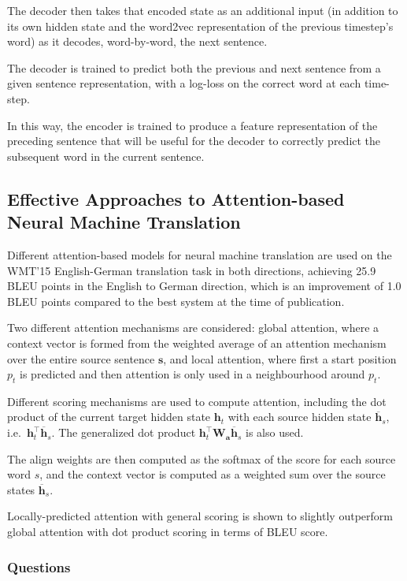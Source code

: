 \documentclass[a4paper, 12pt]{article}
\begin{document}
The decoder then takes that encoded state as an additional input (in addition
to its own hidden state and the word2vec representation of the previous
timestep's word) as it decodes, word-by-word, the next sentence.

The decoder is trained to predict both the previous and next sentence from a
given sentence representation, with a log-loss on the correct word at each
time-step.

In this way, the encoder is trained to produce a feature representation of the
preceding sentence that will be useful for the decoder to correctly predict the
subsequent word in the current sentence.


\subsection{Effective Approaches to Attention-based Neural Machine
            Translation~\citet{DBLP:journals/corr/LuongPM15}}

Different attention-based models for neural machine translation are used on the
WMT'15 English-German translation task in both directions, achieving 25.9 BLEU
points in the English to German direction, which is an improvement of 1.0 BLEU
points compared to the best system at the time of publication.

Two different attention mechanisms are considered: global attention, where a
context vector is formed from the weighted average of an attention mechanism
over the entire source sentence $\mathbf{s}$, and local attention, where first
a start position $p_t$ is predicted and then attention is only used in a
neighbourhood around $p_t$.

Different scoring mechanisms are used to compute attention, including the dot
product of the current target hidden state $\mathbf{h}_t$ with each source
hidden state $\overline{\mathbf{h}}_s$, i.e.\
$\mathbf{h}_t^\intercal \overline{\mathbf{h}}_s$. The generalized dot product
$\mathbf{h}_t^\intercal \mathbf{W}_\mathbf{a} \overline{\mathbf{h}}_s$ is also
used.

The align weights are then computed as the softmax of the score for each source
word $s$, and the context vector is computed as a weighted sum over the source
states $\overline{\mathbf{h}}_s$.

Locally-predicted attention with general scoring is shown to slightly
outperform global attention with dot product scoring in terms of BLEU score.

\subsubsection{Questions}
\end{document}
